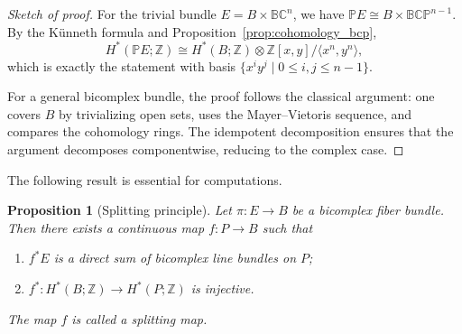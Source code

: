 \documentclass[11pt]{amsart}
\newcommand{\BC}{\mathbb{BC}}       %
\newcommand{\Z}{\mathbb{Z}}
\newcommand{\BCP}{\mathbb{BCP}}
\newtheorem{prop}{Proposition}[section]   %
\theoremstyle{definition}
\begin{document}
\begin{proof}[Sketch of proof]
    For the trivial bundle $E = B \times \BC^n$, we have $\mathbb{P}E \cong B \times \BCP^{n-1}$. By the Künneth formula and Proposition~\ref{prop:cohomology_bcp},
    \begin{equation*}
        H^*(\mathbb{P}E;\Z) \cong H^*(B;\Z) \otimes \Z[x,y]/\langle x^n, y^n\rangle,
    \end{equation*}
    which is exactly the statement with basis $\{x^i y^j \mid 0 \le i,j \le n-1\}$.

    For a general bicomplex bundle, the proof follows the classical argument: one covers $B$ by trivializing open sets, uses the Mayer--Vietoris sequence, and compares the cohomology rings. The idempotent decomposition ensures that the argument decomposes componentwise, reducing to the complex case.
\end{proof}


The following result is essential for computations.

\begin{prop}[Splitting principle]\label{prop:splitting}
    Let $\pi:E \to B$ be a bicomplex fiber bundle. Then there exists a continuous map $f: P \to B$ such that
    \begin{enumerate}
        \item $f^*E$ is a direct sum of bicomplex line bundles on $P$;
        \item $f^*: H^*(B;\Z) \to H^*(P;\Z)$ is injective.
    \end{enumerate}
    The map $f$ is called a \emph{splitting map}.
\end{prop}
\end{document}
